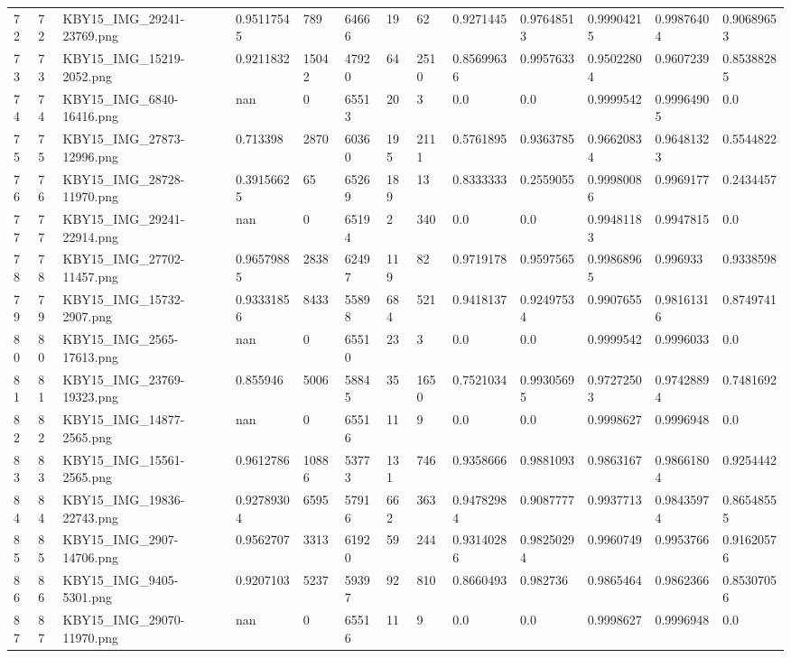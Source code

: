 \documentclass[11pt, a4paper, twoside]{report}
\begin{document}
\begin{longtable}[c]{@{}lllllllllllll@{}}
72 & 72 & KBY15\_IMG\_29241-23769.png & 0.95117545 & 789 & 64666 & 19 & 62 & 0.9271445 & 0.97648513 & 0.99904215 & 0.99876404 & 0.90689653 \\
73 & 73 & KBY15\_IMG\_15219-2052.png & 0.9211832 & 15042 & 47920 & 64 & 2510 & 0.85699636 & 0.9957633 & 0.95022804 & 0.9607239 & 0.85388285 \\
74 & 74 & KBY15\_IMG\_6840-16416.png & nan & 0 & 65513 & 20 & 3 & 0.0 & 0.0 & 0.9999542 & 0.99964905 & 0.0 \\
75 & 75 & KBY15\_IMG\_27873-12996.png & 0.713398 & 2870 & 60360 & 195 & 2111 & 0.5761895 & 0.9363785 & 0.96620834 & 0.96481323 & 0.5544822 \\
76 & 76 & KBY15\_IMG\_28728-11970.png & 0.39156625 & 65 & 65269 & 189 & 13 & 0.8333333 & 0.2559055 & 0.99980086 & 0.9969177 & 0.2434457 \\
77 & 77 & KBY15\_IMG\_29241-22914.png & nan & 0 & 65194 & 2 & 340 & 0.0 & 0.0 & 0.99481183 & 0.9947815 & 0.0 \\
78 & 78 & KBY15\_IMG\_27702-11457.png & 0.96579885 & 2838 & 62497 & 119 & 82 & 0.9719178 & 0.9597565 & 0.99868965 & 0.996933 & 0.9338598 \\
79 & 79 & KBY15\_IMG\_15732-2907.png & 0.93331856 & 8433 & 55898 & 684 & 521 & 0.9418137 & 0.92497534 & 0.9907655 & 0.98161316 & 0.8749741 \\
80 & 80 & KBY15\_IMG\_2565-17613.png & nan & 0 & 65510 & 23 & 3 & 0.0 & 0.0 & 0.9999542 & 0.9996033 & 0.0 \\
81 & 81 & KBY15\_IMG\_23769-19323.png & 0.855946 & 5006 & 58845 & 35 & 1650 & 0.7521034 & 0.99305695 & 0.97272503 & 0.97428894 & 0.7481692 \\
82 & 82 & KBY15\_IMG\_14877-2565.png & nan & 0 & 65516 & 11 & 9 & 0.0 & 0.0 & 0.9998627 & 0.9996948 & 0.0 \\
83 & 83 & KBY15\_IMG\_15561-2565.png & 0.9612786 & 10886 & 53773 & 131 & 746 & 0.9358666 & 0.9881093 & 0.9863167 & 0.98661804 & 0.9254442 \\
84 & 84 & KBY15\_IMG\_19836-22743.png & 0.92789304 & 6595 & 57916 & 662 & 363 & 0.94782984 & 0.9087777 & 0.9937713 & 0.98435974 & 0.86548555 \\
85 & 85 & KBY15\_IMG\_2907-14706.png & 0.9562707 & 3313 & 61920 & 59 & 244 & 0.93140286 & 0.98250294 & 0.9960749 & 0.9953766 & 0.91620576 \\
86 & 86 & KBY15\_IMG\_9405-5301.png & 0.9207103 & 5237 & 59397 & 92 & 810 & 0.8660493 & 0.982736 & 0.9865464 & 0.9862366 & 0.85307056 \\
87 & 87 & KBY15\_IMG\_29070-11970.png & nan & 0 & 65516 & 11 & 9 & 0.0 & 0.0 & 0.9998627 & 0.9996948 & 0.0 \\

\end{longtable}
\end{document}
